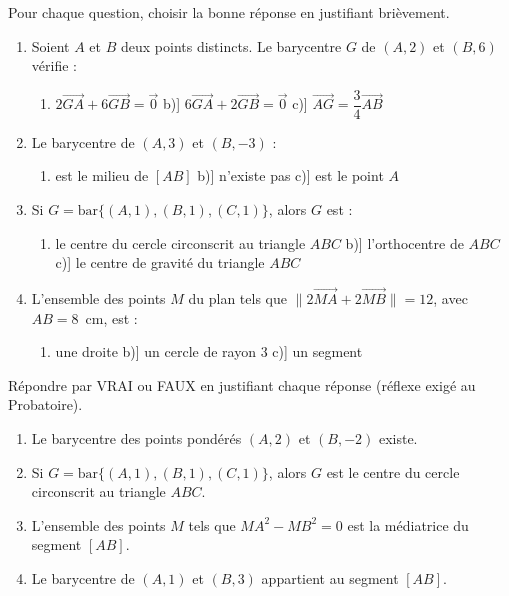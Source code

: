 \documentclass[11pt]{article}
\begin{document}
\begin{exercice}
Pour chaque question, choisir la bonne réponse en justifiant brièvement.
\begin{enumerate}
\item Soient $A$ et $B$ deux points distincts. Le barycentre $G$ de $(A,2)$ et $(B,6)$ vérifie :
\begin{enumerate}
\item[a)] $2\overrightarrow{GA}+6\overrightarrow{GB}=\vec{0}$ \quad b)] $6\overrightarrow{GA}+2\overrightarrow{GB}=\vec{0}$ \quad c)] $\overrightarrow{AG}=\dfrac{3}{4}\overrightarrow{AB}$
\end{enumerate}
\item Le barycentre de $(A,3)$ et $(B,-3)$ :
\begin{enumerate}
\item[a)] est le milieu de $[AB]$ \quad b)] n'existe pas \quad c)] est le point $A$
\end{enumerate}
\item Si $G=\mathrm{bar}\{(A,1),(B,1),(C,1)\}$, alors $G$ est :
\begin{enumerate}
\item[a)] le centre du cercle circonscrit au triangle $ABC$ \quad b)] l'orthocentre de $ABC$ \quad c)] le centre de gravité du triangle $ABC$
\end{enumerate}
\item L'ensemble des points $M$ du plan tels que $\|2\overrightarrow{MA}+2\overrightarrow{MB}\|=12$, avec $AB=8$~cm, est :
\begin{enumerate}
\item[a)] une droite \quad b)] un cercle de rayon $3$ \quad c)] un segment
\end{enumerate}
\end{enumerate}
\end{exercice}

\begin{exercice}
Répondre par VRAI ou FAUX en justifiant chaque réponse (réflexe exigé au Probatoire).
\begin{enumerate}
\item[a)] Le barycentre des points pondérés $(A,2)$ et $(B,-2)$ existe.
\item[b)] Si $G=\mathrm{bar}\{(A,1),(B,1),(C,1)\}$, alors $G$ est le centre du cercle circonscrit au triangle $ABC$.
\item[c)] L'ensemble des points $M$ tels que $MA^{2}-MB^{2}=0$ est la médiatrice du segment $[AB]$.
\item[d)] Le barycentre de $(A,1)$ et $(B,3)$ appartient au segment $[AB]$.
\end{enumerate}
\end{exercice}
\end{document}
